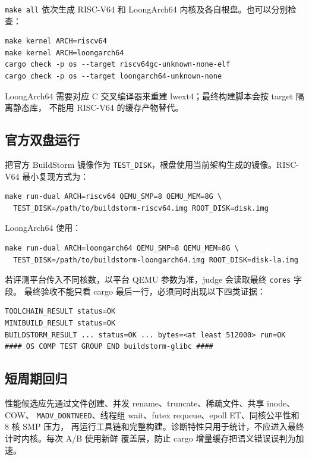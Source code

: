 \documentclass[UTF8,zihao=-4]{ctexart}
\newcommand{\code}{\nolinkurl}
\begin{document}
\code{make all} 依次生成 RISC-V64 和 LoongArch64 内核及各自根盘。也可以分别检查：

\begin{Verbatim}[fontsize=\small,frame=single]
make kernel ARCH=riscv64
make kernel ARCH=loongarch64
cargo check -p os --target riscv64gc-unknown-none-elf
cargo check -p os --target loongarch64-unknown-none
\end{Verbatim}

LoongArch64 需要对应 C 交叉编译器来重建 lwext4；最终构建脚本会按 target 隔离静态库，
不能用 RISC-V64 的缓存产物替代。

\subsection{官方双盘运行}

把官方 BuildStorm 镜像作为 \code{TEST_DISK}，根盘使用当前架构生成的镜像。RISC-V64
最小复现方式为：

\begin{Verbatim}[fontsize=\small,frame=single]
make run-dual ARCH=riscv64 QEMU_SMP=8 QEMU_MEM=8G \
  TEST_DISK=/path/to/buildstorm-riscv64.img ROOT_DISK=disk.img
\end{Verbatim}

LoongArch64 使用：

\begin{Verbatim}[fontsize=\small,frame=single]
make run-dual ARCH=loongarch64 QEMU_SMP=8 QEMU_MEM=8G \
  TEST_DISK=/path/to/buildstorm-loongarch64.img ROOT_DISK=disk-la.img
\end{Verbatim}

若评测平台传入不同核数，以平台 QEMU 参数为准，judge 会读取最终 \code{cores} 字段。
最终验收不能只看 cargo 最后一行，必须同时出现以下四类证据：

\begin{Verbatim}[fontsize=\small,frame=single]
TOOLCHAIN_RESULT status=OK
MINIBUILD_RESULT status=OK
BUILDSTORM_RESULT ... status=OK ... bytes=<at least 512000> run=OK
#### OS COMP TEST GROUP END buildstorm-glibc ####
\end{Verbatim}

\subsection{短周期回归}

性能候选应先通过文件创建、并发 rename、truncate、稀疏文件、共享 inode、COW、
\code{MADV_DONTNEED}、线程组 wait、futex requeue、epoll ET、同核公平性和 8 核 SMP 压力，
再运行工具链和完整构建。诊断特性只用于统计，不应进入最终计时内核。每次 A/B 使用新鲜
覆盖层，防止 cargo 增量缓存把语义错误误判为加速。
\end{document}
